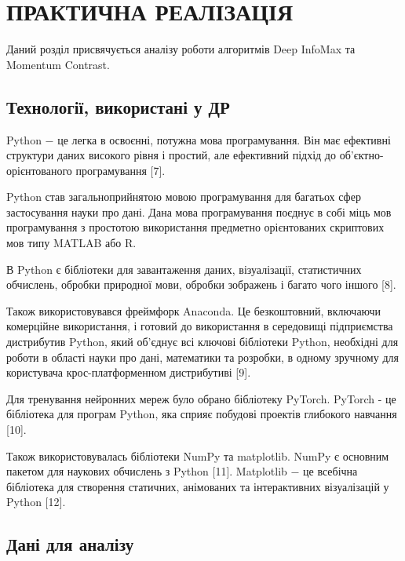\section{ПРАКТИЧНА РЕАЛІЗАЦІЯ}

Даний розділ присвячується аналізу роботи алгоритмів Deep InfoMax та Momentum Contrast.

\subsection{Технології, використані у ДР}

Python $-$ це легка в освоєнні, потужна мова програмування. Він має ефективні структури даних високого рівня і простий, але ефективний підхід до об'єктно-орієнтованого програмування [7].

Python став загальноприйнятою мовою програмування для багатьох сфер застосування науки про дані. Дана мова програмування поєднує в собі міць мов програмування з простотою використання предметно орієнтованих скриптових мов типу MATLAB або R. 

В Python є бібліотеки для завантаження даних, візуалізації, статистичних обчислень, обробки природної мови, обробки зображень і багато чого іншого [8].

Також використовувався фреймфорк Anaconda. Це безкоштовний, включаючи комерційне використання, і готовий до використання в середовищі підприємства дистрибутив Python, який об'єднує всі ключові бібліотеки Python, необхідні для роботи в області науки про дані, математики та розробки, в одному зручному для користувача крос-платформенном дистрибутиві [9].

Для тренування нейронних мереж було обрано бібліотеку PyTorch. PyTorch - це бібліотека для програм Python, яка сприяє побудові проектів глибокого навчання [10].

Також використовувалась бібліотеки NumPy та matplotlib. NumPy є основним пакетом для наукових обчислень з Python [11]. Matplotlib $-$ це всебічна бібліотека для створення статичних, анімованих та інтерактивних візуалізацій у Python [12]. 

\newpage

\subsection{Дані для аналізу}

